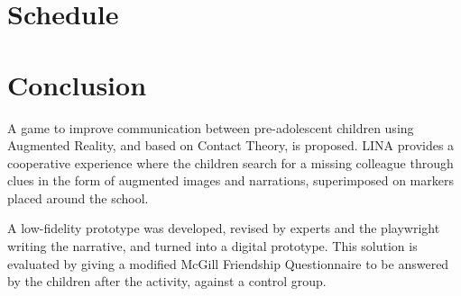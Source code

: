 \documentclass[runningheads]{llncs}
\begin{document}




\section{Schedule}

\section{Conclusion} 
\par A game to improve communication between pre-adolescent children using Augmented Reality, and based on Contact Theory, is proposed. LINA provides a cooperative experience where the children search for a missing colleague through clues in the form of augmented images and narrations, superimposed on markers placed around the school. 
\par A low-fidelity prototype was developed, revised by experts and the playwright writing the narrative, and turned into a digital prototype. This solution is evaluated by giving a modified McGill Friendship Questionnaire to be answered by the children after the activity, against a control group.
\end{document}
